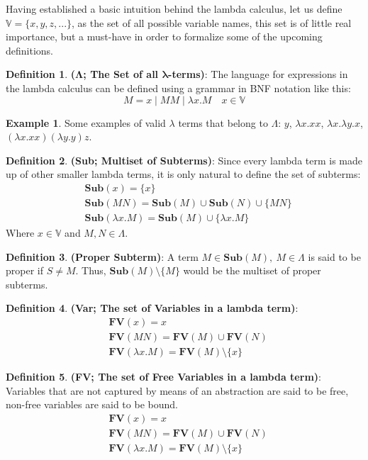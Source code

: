 \documentclass[12pt]{book}
\newcommand{\functionfont}[1]{\mathbf{#1}}
\newcommand{\Sub}[1]{\functionfont {Sub}(#1)}
\newcommand{\FV}[1]{\functionfont {FV}(#1)}
\theoremstyle{plain}
\theoremstyle{definition}
\newtheorem{definition}{Definition}[section]
\theoremstyle{definition}
\newtheorem{example}{Example}[section]
\theoremstyle{remark}
\begin{document}
Having established a basic intuition behind the lambda calculus, let us define $\mathbb{V} = \{x, y, z, ...\}$, as the set of all possible variable names, this set is of little real importance, but a must-have in order to formalize some of the upcoming definitions.
\begin{definition} \textbf{($\mathbf{\Lambda}$; The Set of all $\mathbf{\lambda}$-terms)}: The language for expressions in the lambda calculus can be defined using a grammar in BNF notation like this:
  \label{def:lambda-terms}
  \[
    M = x \mid MM \mid \lambda x . M \quad x \in \mathbb{V}
  \]
\end{definition}
\begin{example} Some examples of valid $\lambda$ terms that belong to $\Lambda$:
  \( y \),
  \( \lambda x. x x \),
  \( \lambda x. \lambda y. x \),
  \( (\lambda x. x x) (\lambda y. y) z \).
\end{example}
\begin{definition} \textbf{(Sub; Multiset of Subterms)}: Since every lambda term is made up of other smaller lambda terms, it is only natural to define the set of subterms:
\begin{align*}
  &\Sub x = \{x\} \\
  &\Sub {MN} = \Sub M  \cup \Sub N \cup \{MN\} \\
  &\Sub {\lambda x . M} = \Sub M  \cup \{\lambda x. M\}
\end{align*}
Where $x \in \mathbb{V}$ and $M, N \in \Lambda $.
\end{definition}
\begin{definition} \textbf{(Proper Subterm)}: A term $M \in \Sub M, \ M \in \Lambda$ is said to be proper if $S \neq M$. Thus, $\Sub{M} \setminus \{M\}$ would be the multiset of proper subterms.
\end{definition}
\begin{definition} \textbf{(Var; The set of Variables in a lambda term)}:
\begin{align*}
    & \FV x = {x}\\
    & \FV {MN} = \FV M \cup \FV {N} \\
    & \FV {\lambda x . M} = \FV M \setminus \{x\}
\end{align*}
\end{definition}
\begin{definition} \textbf{(FV; The set of Free Variables in a lambda term)}: Variables that are not captured by means of an abstraction are said to be free, non-free variables are said to be bound.
\begin{align*}
    & \FV x = {x}\\
    & \FV {MN} = \FV M \cup \FV {N} \\
    & \FV {\lambda x . M} = \FV M \setminus \{x\}
\end{align*}
\end{definition}
\end{document}
